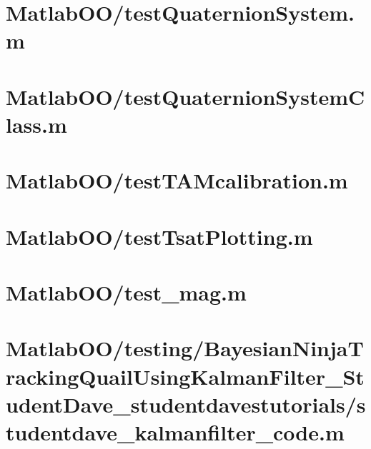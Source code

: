 \pagebreak
\section{MatlabOO/testQuaternionSystem.m}\label{code:MatlabOO/testQuaternionSystem.m}


\pagebreak
\section{MatlabOO/testQuaternionSystemClass.m}\label{code:MatlabOO/testQuaternionSystemClass.m}


\pagebreak
\section{MatlabOO/testTAMcalibration.m}\label{code:MatlabOO/testTAMcalibration.m}


\pagebreak
\section{MatlabOO/testTsatPlotting.m}\label{code:MatlabOO/testTsatPlotting.m}


\pagebreak
\section{MatlabOO/test\_mag.m}\label{code:MatlabOO/test_mag.m}


\pagebreak
\section{MatlabOO/testing/BayesianNinjaTrackingQuailUsingKalmanFilter\_StudentDave\_studentdavestutorials/studentdave\_kalmanfilter\_code.m}\label{code:MatlabOO/testing/BayesianNinjaTrackingQuailUsingKalmanFilter_StudentDave_studentdavestutorials/studentdave_kalmanfilter_code.m}


